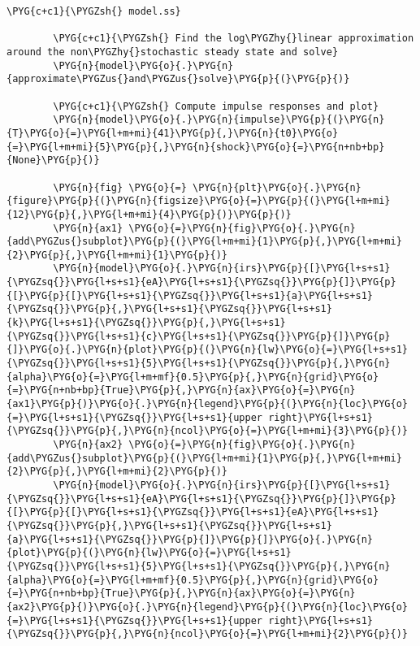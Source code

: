 \documentclass[letterpaper,10pt,openany,oneside,english]{sphinxmanual}
\begin{document}
\begin{Verbatim}[commandchars=\\\{\}]
        \PYG{c+c1}{\PYGZsh{} model.ss}
        
        \PYG{c+c1}{\PYGZsh{} Find the log\PYGZhy{}linear approximation around the non\PYGZhy{}stochastic steady state and solve}
        \PYG{n}{model}\PYG{o}{.}\PYG{n}{approximate\PYGZus{}and\PYGZus{}solve}\PYG{p}{(}\PYG{p}{)}
        
        \PYG{c+c1}{\PYGZsh{} Compute impulse responses and plot}
        \PYG{n}{model}\PYG{o}{.}\PYG{n}{impulse}\PYG{p}{(}\PYG{n}{T}\PYG{o}{=}\PYG{l+m+mi}{41}\PYG{p}{,}\PYG{n}{t0}\PYG{o}{=}\PYG{l+m+mi}{5}\PYG{p}{,}\PYG{n}{shock}\PYG{o}{=}\PYG{n+nb+bp}{None}\PYG{p}{)}
        
        \PYG{n}{fig} \PYG{o}{=} \PYG{n}{plt}\PYG{o}{.}\PYG{n}{figure}\PYG{p}{(}\PYG{n}{figsize}\PYG{o}{=}\PYG{p}{(}\PYG{l+m+mi}{12}\PYG{p}{,}\PYG{l+m+mi}{4}\PYG{p}{)}\PYG{p}{)}
        \PYG{n}{ax1} \PYG{o}{=}\PYG{n}{fig}\PYG{o}{.}\PYG{n}{add\PYGZus{}subplot}\PYG{p}{(}\PYG{l+m+mi}{1}\PYG{p}{,}\PYG{l+m+mi}{2}\PYG{p}{,}\PYG{l+m+mi}{1}\PYG{p}{)}
        \PYG{n}{model}\PYG{o}{.}\PYG{n}{irs}\PYG{p}{[}\PYG{l+s+s1}{\PYGZsq{}}\PYG{l+s+s1}{eA}\PYG{l+s+s1}{\PYGZsq{}}\PYG{p}{]}\PYG{p}{[}\PYG{p}{[}\PYG{l+s+s1}{\PYGZsq{}}\PYG{l+s+s1}{a}\PYG{l+s+s1}{\PYGZsq{}}\PYG{p}{,}\PYG{l+s+s1}{\PYGZsq{}}\PYG{l+s+s1}{k}\PYG{l+s+s1}{\PYGZsq{}}\PYG{p}{,}\PYG{l+s+s1}{\PYGZsq{}}\PYG{l+s+s1}{c}\PYG{l+s+s1}{\PYGZsq{}}\PYG{p}{]}\PYG{p}{]}\PYG{o}{.}\PYG{n}{plot}\PYG{p}{(}\PYG{n}{lw}\PYG{o}{=}\PYG{l+s+s1}{\PYGZsq{}}\PYG{l+s+s1}{5}\PYG{l+s+s1}{\PYGZsq{}}\PYG{p}{,}\PYG{n}{alpha}\PYG{o}{=}\PYG{l+m+mf}{0.5}\PYG{p}{,}\PYG{n}{grid}\PYG{o}{=}\PYG{n+nb+bp}{True}\PYG{p}{,}\PYG{n}{ax}\PYG{o}{=}\PYG{n}{ax1}\PYG{p}{)}\PYG{o}{.}\PYG{n}{legend}\PYG{p}{(}\PYG{n}{loc}\PYG{o}{=}\PYG{l+s+s1}{\PYGZsq{}}\PYG{l+s+s1}{upper right}\PYG{l+s+s1}{\PYGZsq{}}\PYG{p}{,}\PYG{n}{ncol}\PYG{o}{=}\PYG{l+m+mi}{3}\PYG{p}{)}
        \PYG{n}{ax2} \PYG{o}{=}\PYG{n}{fig}\PYG{o}{.}\PYG{n}{add\PYGZus{}subplot}\PYG{p}{(}\PYG{l+m+mi}{1}\PYG{p}{,}\PYG{l+m+mi}{2}\PYG{p}{,}\PYG{l+m+mi}{2}\PYG{p}{)}
        \PYG{n}{model}\PYG{o}{.}\PYG{n}{irs}\PYG{p}{[}\PYG{l+s+s1}{\PYGZsq{}}\PYG{l+s+s1}{eA}\PYG{l+s+s1}{\PYGZsq{}}\PYG{p}{]}\PYG{p}{[}\PYG{p}{[}\PYG{l+s+s1}{\PYGZsq{}}\PYG{l+s+s1}{eA}\PYG{l+s+s1}{\PYGZsq{}}\PYG{p}{,}\PYG{l+s+s1}{\PYGZsq{}}\PYG{l+s+s1}{a}\PYG{l+s+s1}{\PYGZsq{}}\PYG{p}{]}\PYG{p}{]}\PYG{o}{.}\PYG{n}{plot}\PYG{p}{(}\PYG{n}{lw}\PYG{o}{=}\PYG{l+s+s1}{\PYGZsq{}}\PYG{l+s+s1}{5}\PYG{l+s+s1}{\PYGZsq{}}\PYG{p}{,}\PYG{n}{alpha}\PYG{o}{=}\PYG{l+m+mf}{0.5}\PYG{p}{,}\PYG{n}{grid}\PYG{o}{=}\PYG{n+nb+bp}{True}\PYG{p}{,}\PYG{n}{ax}\PYG{o}{=}\PYG{n}{ax2}\PYG{p}{)}\PYG{o}{.}\PYG{n}{legend}\PYG{p}{(}\PYG{n}{loc}\PYG{o}{=}\PYG{l+s+s1}{\PYGZsq{}}\PYG{l+s+s1}{upper right}\PYG{l+s+s1}{\PYGZsq{}}\PYG{p}{,}\PYG{n}{ncol}\PYG{o}{=}\PYG{l+m+mi}{2}\PYG{p}{)}
\end{Verbatim}
\end{document}
